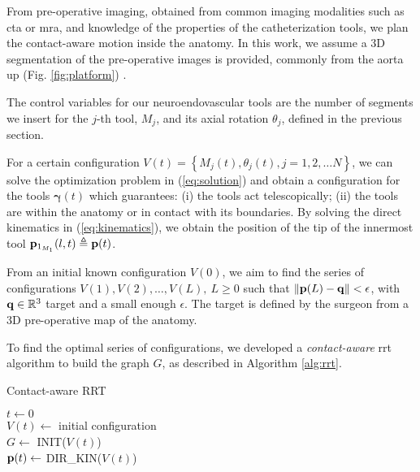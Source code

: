 From pre-operative imaging, obtained from common imaging modalities such as \gls{cta} or \gls{mra}, and knowledge of the properties of the catheterization tools, we plan the contact-aware motion inside the anatomy. In this work, we assume a 3D segmentation of the pre-operative images is provided, commonly from the aorta up (Fig. \ref{fig:platform}) \cite{vanderZijden2019CurrentClinician}.

The control variables for our neuroendovascular tools are the number of segments we insert for the $j$-th tool, $M_j$, and its axial rotation $\theta_j$, defined in the previous section.

For a certain configuration $V(t) = \left\{M_j(t), \theta_j(t), j = 1, 2, \dots N\right\}$, we can solve the optimization problem in (\ref{eq:solution}) and obtain a configuration for the tools $\pmb \gamma(t)$ which guarantees: (i) the tools act telescopically; (ii) the tools are within the anatomy or in contact with its boundaries. By solving the direct kinematics in (\ref{eq:kinematics}), we obtain the position of the tip of the innermost tool $\mathbf{p}_{1_{M_1}}(l, t) \triangleq \mathbf{p}(t)$. 

From an initial known configuration $V(0)$, we aim to find the series of configurations $V(1), V(2), \dots, V(L), \ L \geq 0$ such that $\| \mathbf{p}(L) - \mathbf{q}\| < \epsilon$, with $\mathbf{q} \in \mathbb{R}^3$ target and a small enough $\epsilon$. The target is defined by the surgeon from a 3D pre-operative map of the anatomy.

To find the optimal series of configurations, we developed a \emph{contact-aware} \gls{rrt} algorithm to build the graph $G$, as described in Algorithm \ref{alg:rrt}.

\begin{algorithm}
\caption{Contact-aware RRT}\label{alg:rrt}
$t \gets 0$ \\
$V(t) \gets$ initial configuration \\
$G \gets$ INIT($V(t)$) \\
$\mathbf{p}(t) \gets$ DIR\_KIN($V(t)$)\\
\end{algorithm}

